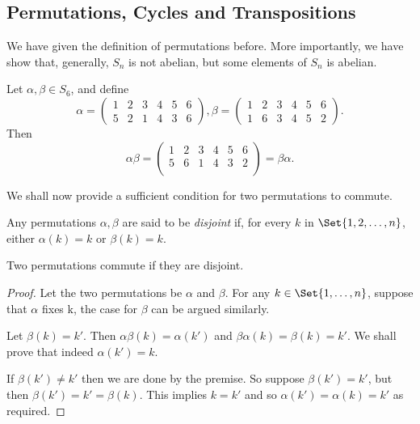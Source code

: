 \documentclass[main.tex]{subfiles}
\begin{document}
			\subsection{Permutations, Cycles and Transpositions}
				We have given the definition of permutations before. More importantly, we have show that, generally, $S_n$ is not abelian, but some elements of $S_n$ is abelian.
				\begin{example}
					Let $\alpha, \beta \in S_6$, and define
					\begin{equation*}
						\alpha =
						\begin{pmatrix}
							1 & 2 & 3 & 4 & 5 & 6\\
							5 & 2 & 1 & 4 & 3 & 6
						\end{pmatrix},
						\beta =
						\begin{pmatrix}
							1 & 2 & 3 & 4 & 5 & 6\\
							1 & 6 & 3 & 4 & 5 & 2
						\end{pmatrix}.
					\end{equation*}
					Then
					\begin{equation*}
						\alpha\beta = 
						\begin{pmatrix}
							1 & 2 & 3 & 4 & 5 & 6\\
							5 & 6 & 1 & 4 & 3 & 2\\
						\end{pmatrix}
						= \beta\alpha.
					\end{equation*}
				\end{example}
				We shall now provide a sufficient condition for two permutations to commute.
				\begin{definition}
					Any permutations $\alpha, \beta$ are said to be \textit{disjoint} if, for every $k$ in $\Set{1, 2, \ldots, n}$, either $\alpha(k) = k$ or $\beta(k) = k$.
				\end{definition}
				\begin{theorem}
					Two permutations commute if they are disjoint.
				\end{theorem}
				\begin{proof}
					Let the two permutations be $\alpha$ and $\beta$. For any $k \in \Set{1, \ldots, n}$, suppose that $\alpha$ fixes k, the case for $\beta$ can be argued similarly. 
					
					Let $\beta(k) = k'$. Then $\alpha\beta (k) = \alpha(k')$ and $\beta\alpha(k) = \beta(k) = k'$. We shall prove that indeed $\alpha(k') = k$.
					
					If $\beta(k') \neq k'$ then we are done by the premise. So suppose $\beta(k') = k'$, but then $\beta(k') = k' = \beta(k)$. This implies $k = k'$ and so $\alpha(k') = \alpha(k) = k'$ as required.
				\end{proof}
			
\end{document}
